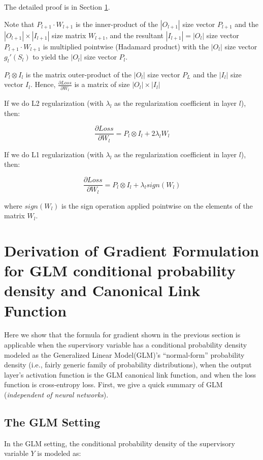 \documentclass[10pt]{amsart}
\begin{document}
The detailed proof is in Section \ref{section:CanonicalLink}.

Note that $P_{l+1} \cdot W_{l+1}$ is the inner-product of the $| O_{l+1} |$ size vector $P_{l+1}$ and the $| O_{l+1} | \times | I_{l+1} |$ size matrix $W_{l+1}$, and the resultant $| I_{l+1} | = | O_l |$ size vector $P_{l+1} \cdot W_{l+1}$ is multiplied pointwise (Hadamard product) with the $| O_l |$ size vector $g_l'(S_l)$ to yield the $| O_l |$ size vector $P_l$.

$P_l \otimes I_l$ is the matrix outer-product of the $| O_l |$ size vector $P_L$ and the $| I_l |$ size vector $I_l$. Hence, $\frac {\partial Loss} {\partial W_l}$ is a matrix of size $| O_l | \times | I_l |$

If we do L2 regularization (with $\lambda_l$ as the regularization coefficient in layer $l$), then:

$$ \frac {\partial Loss} {\partial W_l} = P_l \otimes I_l + 2 \lambda_l W_l$$

If we do L1 regularization (with $\lambda_l$ as the regularization coefficient in layer $l$), then:

$$ \frac {\partial Loss} {\partial W_l} = P_l \otimes I_l + \lambda_l sign(W_l)$$

where $sign(W_l)$ is the sign operation applied pointwise on the elements of the matrix $W_l$.

\section{Derivation of Gradient Formulation for GLM conditional probability density and Canonical Link Function} 
\label{section:CanonicalLink}

Here we show that the formula for gradient shown in the previous section is applicable when the supervisory variable has a conditional probability density modeled as the Generalized Linear Model(GLM)'s ``normal-form'' probability density (i.e., fairly generic family of probability distributions), when the output layer's activation function is the GLM canonical link function, and when the loss function is cross-entropy loss. First, we give a quick summary of GLM ({\em independent of neural networks}).

\subsection{The GLM Setting}
In the GLM setting, the conditional probability density of the supervisory variable $Y$ is modeled as:
\end{document}
